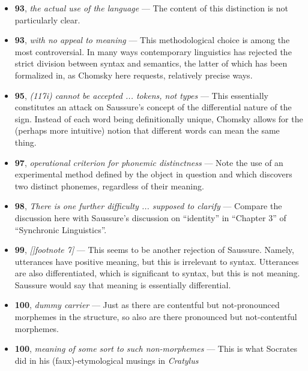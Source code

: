 \documentclass[12pt]{article}
\begin{document}
\begin{itemize}

\item \textbf{93}, \textit{the actual use of the language} --- The content of this distinction is not particularly clear.

\item \textbf{93}, \textit{with no appeal to meaning} --- This methodological choice is among the most controversial. In many ways contemporary linguistics has rejected the strict division between syntax and semantics, the latter of which has been formalized in, as Chomsky here requests, relatively precise ways.

\item \textbf{95}, \textit{(117i) cannot be accepted ... tokens, not types} --- This essentially constitutes an attack on Saussure's concept of the differential nature of the sign. Instead of each word being definitionally unique, Chomsky allows for the (perhaps more intuitive) notion that different words can mean the same thing.

\item \textbf{97}, \textit{operational criterion  for phonemic distinctness} --- Note the use of an experimental method defined by the object in question and which discovers two distinct phonemes, regardless of their meaning.

\item \textbf{98}, \textit{There is one further difficulty ... supposed to clarify} --- Compare the discussion here with Saussure's discussion on ``identity'' in ``Chapter 3'' of ``Synchronic Linguistics''.

\item \textbf{99}, \textit{[]footnote 7]} --- This seems to be another rejection of Saussure. Namely, utterances have positive meaning, but this is irrelevant to syntax. Utterances are also differentiated, which is significant to syntax, but this is not meaning. Saussure would say that meaning is essentially differential.

\item \textbf{100}, \textit{dummy carrier} --- Just as there are contentful but not-pronounced morphemes in the structure, so also are there pronounced but not-contentful morphemes.

\item \textbf{100}, \textit{meaning of some sort to such non-morphemes} --- This is what Socrates did in his (faux)-etymological musings in \textit{Cratylus}


\end{itemize}
\end{document}

